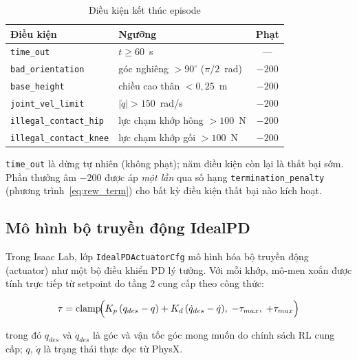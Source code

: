\begin{table}[H]
    \centering
    \caption{Điều kiện kết thúc episode}
    \label{tab:terminations}
    \renewcommand{\arraystretch}{1.3}
    \begin{tabular}{|l|l|c|}
    \hline
    \textbf{Điều kiện} & \textbf{Ngưỡng} & \textbf{Phạt} \\
    \hline
    \texttt{time\_out}              & $t \geq 60$~s                         & — \\
    \texttt{bad\_orientation}       & góc nghiêng $> 90^\circ$ ($\pi/2$~rad) & $-200$ \\
    \texttt{base\_height}           & chiều cao thân $< 0{,}25$~m           & $-200$ \\
    \texttt{joint\_vel\_limit}      & $|\dot{q}| > 150$~rad/s               & $-200$ \\
    \texttt{illegal\_contact\_hip}  & lực chạm khớp hông $> 100$~N          & $-200$ \\
    \texttt{illegal\_contact\_knee} & lực chạm khớp gối $> 100$~N           & $-200$ \\
    \hline
    \end{tabular}
\end{table}

\texttt{time\_out} là dừng tự nhiên (không phạt); năm điều kiện còn lại là
thất bại sớm. Phần thưởng âm $-200$ được áp \emph{một lần} qua số hạng
\texttt{termination\_penalty} (phương trình~\eqref{eq:rew_term}) cho bất kỳ
điều kiện thất bại nào kích hoạt.


\subsection{Mô hình bộ truyền động IdealPD}
\label{sec:ideal_pd}

Trong Isaac Lab, lớp \texttt{IdealPDActuatorCfg} mô hình hóa bộ truyền động (actuator)
như một bộ điều khiển PD lý tưởng. Với mỗi khớp, mô-men xoắn được tính
trực tiếp từ setpoint do tầng 2 cung cấp theo công thức:

\begin{equation}
    \tau = \operatorname{clamp}\!\Bigl(
        K_p\,(q_{des} - q)
        + K_d\,(\dot{q}_{des} - \dot{q}),\;
        -\tau_{max},\; +\tau_{max}
    \Bigr)
    \label{eq:ideal_pd}
\end{equation}

trong đó $q_{des}$ và $\dot{q}_{des}$ là góc và vận tốc góc mong muốn
do chính sách RL cung cấp; $q$, $\dot{q}$ là trạng thái thực đọc từ
PhysX.


